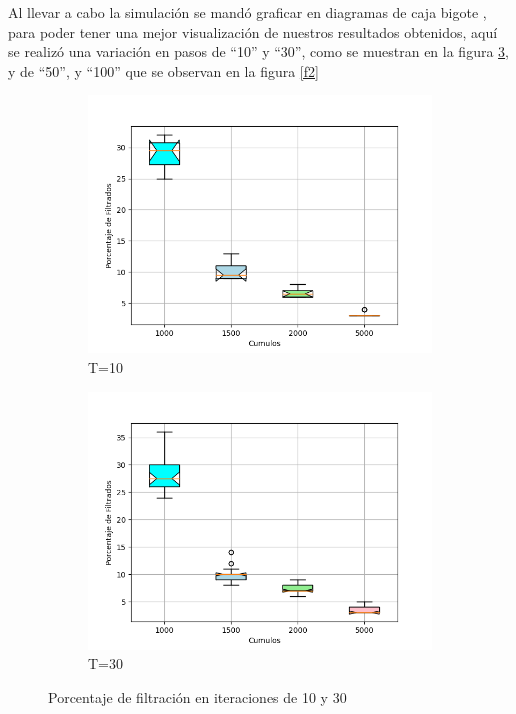 \documentclass{article}
\begin{document}
 Al llevar a cabo la simulaci\'on se mand\'o graficar en diagramas de caja bigote \citep{ana}, para poder tener una mejor visualizaci\'on de nuestros resultados obtenidos, aqu\'i se realiz\'o una variaci\'on en pasos de ``10'' y ``30'', como se muestran en la figura \ref{f1}, y de ``50'', y ``100'' que se observan en la figura \ref{f2}

\begin{figure}[H]
       \centering
       \begin{subfigure}[b]{0.90\linewidth}
           \includegraphics[width=\linewidth]{cumulos10.png}
           \caption{T=10}
           \label{f1.a}
        \end{subfigure}
 \begin{subfigure}[b]{0.90\linewidth}
           \includegraphics[width=\linewidth]{cumulos30.png}
           \caption{T=30}
           \label{f1.b}
        \end{subfigure}
\caption{Porcentaje de filtraci\'on en iteraciones de 10 y 30}
        \label{f1}
\end{figure}
\end{document}
